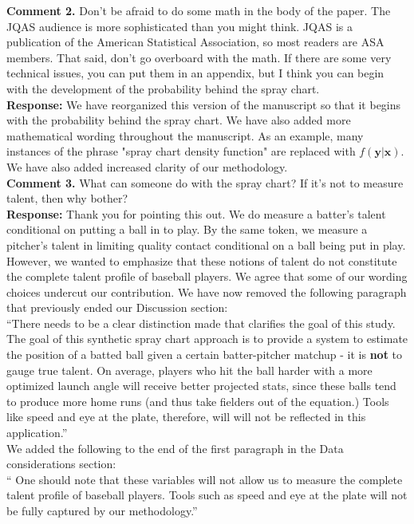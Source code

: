 \documentclass[12pt]{article}
\newcommand{\y}{\textbf{y}}
\newcommand{\x}{\textbf{x}}
\begin{document}
\noindent\textbf{Comment 2.} Don’t be afraid to do some math in the body of the paper. The JQAS audience is more sophisticated than you might think. JQAS is a publication of the American Statistical Association, so most readers are ASA members. That said, don’t go overboard with the math. If there are some very technical issues, you can put them in an appendix, but I think you can begin with the development of the probability behind the spray chart. \\


\noindent\textbf{Response:} We have reorganized this version of the manuscript so that it begins with the probability behind the spray chart. We have also added more mathematical wording throughout the manuscript. As an example, many instances of the phrase "spray chart density function" are replaced with $f(\y|\x)$. We have also added increased clarity of our methodology.  \\

\noindent\textbf{Comment 3.} What can someone do with the spray chart? If it’s not to measure talent, then why bother? \\

\noindent\textbf{Response:} Thank you for pointing this out. We do measure a batter's talent conditional on putting a ball in to play. By the same token, we measure a pitcher's talent in limiting quality contact conditional on a ball being put in play. However, we wanted to emphasize that these notions of talent do not constitute the complete talent profile of baseball players. We agree that some of our wording choices undercut our contribution. We have now removed the following paragraph that previously ended our Discussion section: \\

``There needs to be a clear distinction made that clarifies the goal of this study. The goal of this synthetic spray chart approach is to provide a system to estimate the position of a batted ball given a certain batter-pitcher matchup - it is \textbf{not} to gauge true talent. On average, players who hit the ball harder with a more optimized launch angle will receive better projected stats, since these balls tend to produce more home runs (and thus take fielders out of the equation.) Tools like speed and eye at the plate, therefore, will will not be reflected in this application.'' \\

\noindent We added the following to the end of the first paragraph in the Data considerations section: \\

`` One should note that these variables will not allow us to measure the complete talent profile of baseball players. Tools such as speed and eye at the plate will not be fully captured by our methodology.''
	
\end{document}
